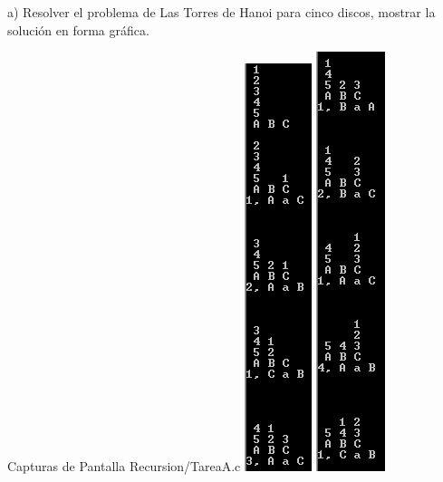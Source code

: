 a) Resolver el problema de Las Torres de Hanoi
para cinco discos, mostrar la solución en forma
gráfica.

Capturas de Pantalla Recursion/TareaA.c
\newline
\includegraphics{Recursion/img/TareaA_1.png}
\includegraphics{Recursion/img/TareaA_2.png}
